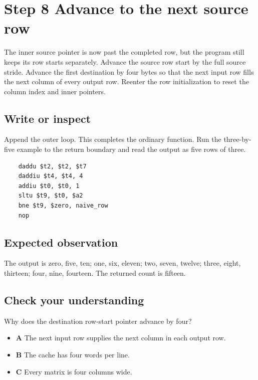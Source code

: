 \section{Step 8 Advance to the next source row}\label{transpose-s08}

The inner source pointer is now past the completed row, but the program still keeps its row starts separately. Advance the source row start by the full source stride. Advance the first destination by four bytes so that the next input row fills the next column of every output row. Reenter the row initialization to reset the column index and inner pointers.

\subsection{Write or inspect}
Append the outer loop. This completes the ordinary function. Run the three-by-five example to the return boundary and read the output as five rows of three.

\begin{verbatim}
    daddu $t2, $t2, $t7
    daddiu $t4, $t4, 4
    addiu $t0, $t0, 1
    sltu $t9, $t0, $a2
    bne $t9, $zero, naive_row
    nop
\end{verbatim}

\subsection{Expected observation}
The output is zero, five, ten; one, six, eleven; two, seven, twelve; three, eight, thirteen; four, nine, fourteen. The returned count is fifteen.

\subsection{Check your understanding}
Why does the destination row-start pointer advance by four?

\begin{itemize}
  \item \textbf{A} The next input row supplies the next column in each output row.
  \item \textbf{B} The cache has four words per line.
  \item \textbf{C} Every matrix is four columns wide.
\end{itemize}
